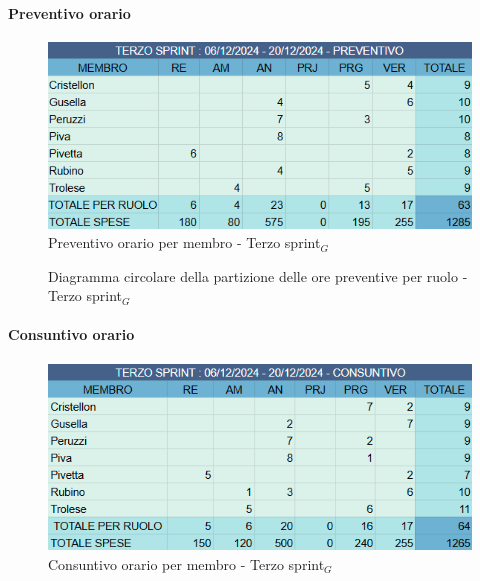\documentclass[10pt]{article}
\begin{document}
{{{{    \paragraph{Preventivo orario}\mbox{}\vspace{0.4em}
    \begin{figure}[H]
    	\centering
    	\includegraphics[width=0.6\linewidth]{preventivoOreTerzoSprint.PNG}
    	\caption{Preventivo orario per membro - Terzo sprint$_G$}
    	\label{fig:Preventivo orario per membro - Terzo sprint$_G$}
    \end{figure}

    \begin{figure}[H]
        \centering
        \caption{Diagramma circolare della partizione delle ore preventive per ruolo - Terzo sprint$_G$ }
        \label{fig:Diagramma circolare della partizione delle ore preventive per ruolo - Terzo sprint$_G$}
    \end{figure}
    
    \paragraph{Consuntivo orario}\mbox{}\vspace{0.4em}
    \begin{figure}[ht]
    	\centering
    	\includegraphics[width=0.6\linewidth]{consuntivoOreTerzoSprint.PNG}
    	\caption{Consuntivo orario per membro - Terzo sprint$_G$}
    	\label{fig:Consuntivo orario per membro - terzo sprint$_G$}
    \end{figure}

}}}}
\end{document}
